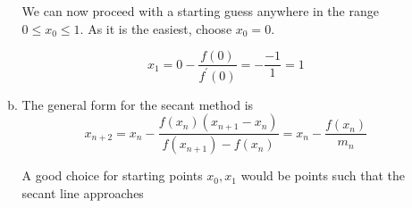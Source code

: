 \documentclass[11pt]{article}
\begin{document}
\begin{enumerate}
\begin{enumerate}[(a)]
		We can now proceed with a starting guess anywhere in the range $0 \leq x_0 \leq 1$. As it is the easiest, choose $x_0 = 0$.

		$$x_1 = 0 - \frac{f(0)}{f^{'}(0)} = -\frac{-1}{1} = 1$$

		\item The general form for the secant method is
			$$x_{n+2} = x_{n} - \frac{f(x_n)(x_{n+1}-x_n)}{f(x_{n+1})-f(x_n)} = x_n - \frac{f(x_n)}{m_n} $$

			A good choice for starting points $x_0, x_1$ would be points such that the secant line approaches
	\end{enumerate}
\end{enumerate}
\end{document}
